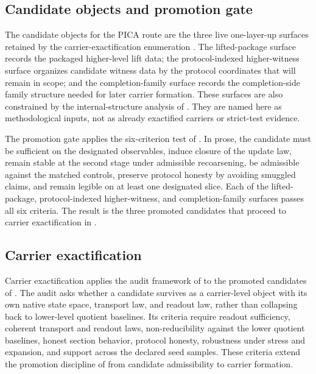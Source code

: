 \documentclass[11pt]{article}
\theoremstyle{definition}
\begin{document}
\subsection{Candidate objects and promotion gate}\label{subsec:candidate-objects-promotion-gate}

The candidate objects for the PICA route are the three live one-layer-up
surfaces retained by the carrier-exactification enumeration
\cite{Tsiokos2026CarrierExactification}.  The lifted-package surface records
the packaged higher-level lift data; the protocol-indexed higher-witness
surface organizes candidate witness data by the protocol coordinates that will
remain in scope; and the completion-family surface records the completion-side
family structure needed for later carrier formation.  These surfaces are also
constrained by the internal-structure analysis of
\cite{Tsiokos2026InternalStructure}.  They are named here as methodological
inputs, not as already exactified carriers or strict-test evidence.

The promotion gate applies the six-criterion test of
\cite{Tsiokos2026PromotionCriteria}.  In prose, the candidate must be
sufficient on the designated observables, induce closure of the update law,
remain stable at the second stage under admissible recoarsening, be admissible
against the matched controls, preserve protocol honesty by avoiding smuggled
claims, and remain legible on at least one designated slice.  Each of the
lifted-package, protocol-indexed higher-witness, and completion-family surfaces
passes all six criteria.  The result is the three promoted candidates that
proceed to carrier exactification in .

\subsection{Carrier exactification}\label{subsec:carrier-exactification}

Carrier exactification applies the audit framework of
\cite{Tsiokos2026CarrierExactification} to the promoted candidates of
.  The audit asks whether a
candidate survives as a carrier-level object with its own native state space,
transport law, and readout law, rather than collapsing back to lower-level
quotient baselines.  Its criteria require readout sufficiency, coherent
transport and readout laws, non-reducibility against the lower quotient
baselines, honest section behavior, protocol honesty, robustness under stress
and expansion, and support across the declared seed samples.  These criteria
extend the promotion discipline of \cite{Tsiokos2026PromotionCriteria} from
candidate admissibility to carrier formation.
\end{document}
